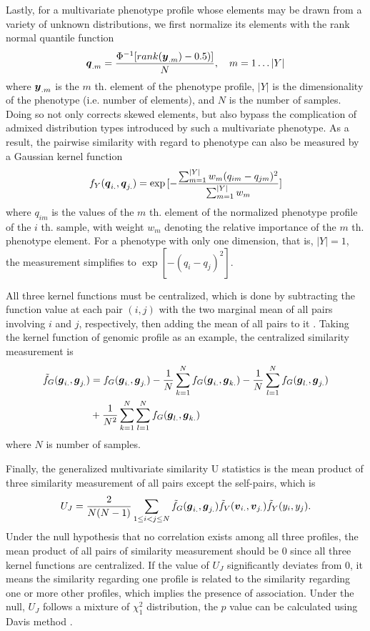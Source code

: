 Lastly, for a multivariate phenotype profile whose elements may be drawn from a variety of unknown distributions, we first normalize its elements with the rank normal quantile function
\[ \boldsymbol{q}_{.m} = \frac{\Phi^{-1}[rank(\boldsymbol{y}_{.m}) - 0.5)]}{N}, \quad m = 1 \dots |Y| \]
where $\boldsymbol{y}_{.m}$ is the $m$ th. element of the phenotype profile, $|Y|$ is the dimensionality of the phenotype (i.e. number of elements), and $N$ is the number of samples. Doing so not only corrects skewed elements, but also bypass the complication of admixed distribution types introduced by such a multivariate phenotype. As a result, the pairwise similarity with regard to phenotype can also be measured by a Gaussian kernel function
\[ f_Y(\boldsymbol{q}_{i.}, \boldsymbol{q}_{j.}) = \exp{[-\frac{\sum_{m=1}^{|Y|}{w_m(q_{im}-q_{jm})^2}} {\sum_{m=1}^{|Y|}{w_m}}]} \]
where $q_{im}$ is the values of the $m$ th. element of the normalized phenotype profile of the $i$ th. sample, with weight $w_m$ denoting the relative importance of the $m$ th. phenotype element. For a phenotype with only one dimension, that is, $|Y|=1$, the measurement simplifies to $\exp{[-(q_i - q_j)^2]}$.

All three kernel functions must be centralized, which is done by subtracting the function value at each pair $(i,j)$ with the two marginal mean of all pairs involving $i$ and $j$, respectively, then adding the mean of all pairs to it \cite{UST1}. Taking the kernel function of genomic profile as an example, the centralized similarity measurement is
\begin{align*}
  \tilde{f}_G(\boldsymbol{g}_{i.}, \boldsymbol{g}_{j.})
  &= f_G(\boldsymbol{g}_{i.}, \boldsymbol{g}_{j.})-\frac{1}{N} \sum_{k=1}^N{f_G(\boldsymbol{g}_{i.}, \boldsymbol{g}_{k.})}-\frac{1}{N}\sum_{l=1}^N{f_G(\boldsymbol{g}_{l.}, \boldsymbol{g}_{j.})} \\ 
  &+ \frac{1}{N^2} \sum_{k=1}^{N} \sum_{l=1}^{N} {f_G(\boldsymbol{g}_{l.}, \boldsymbol{g}_{k.})}
\end{align*}
where $N$ is number of samples. 

Finally, the generalized multivariate similarity U statistics is the mean product of three similarity measurement of all pairs except the self-pairs, which is
\[ U_J = \frac{2}{N(N-1)} \sum_{1 \leq i < j \leq N}^{} \tilde{f}_G(\boldsymbol{g}_{i.}, \boldsymbol{g}_{j.}) \tilde{f}_V(\boldsymbol{v}_{i.}, \boldsymbol{v}_{j.}) \tilde{f}_Y(y_i, y_j). \]
Under the null hypothesis that no correlation exists among all three profiles, the mean product of all pairs of similarity measurement should be $0$ since all three kernel functions are centralized. If the value of $U_J$ significantly deviates from $0$, it means the similarity regarding one profile is related to the similarity regarding one or more other profiles, which implies the presence of association. Under the null, $U_J$ follows a mixture of $\chi_1^2$ distribution, the $p$ value can be calculated using Davis method \cite{UST1, UST2}.

